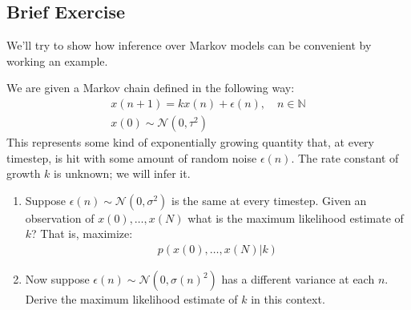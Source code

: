 \documentclass{article}
\begin{document}
\subsection{Brief Exercise}
We'll try to show how inference over Markov models can be convenient by working an example.
\begin{exercise}
We are given a Markov chain defined in the following way:
\begin{align*}
x(n + 1) = k x(n) + \epsilon(n), \quad n \in \mathbb{N} \\
x(0) \sim \mathcal{N}(0, \tau^2)
\end{align*}
This represents some kind of exponentially growing quantity that, at every timestep, is hit with some amount of random noise $\epsilon(n)$. The rate constant of growth $k$ is unknown; we will infer it.

\begin{enumerate}
	\item Suppose $\epsilon(n) \sim \mathcal{N}(0, \sigma^2)$ is the same at every timestep. Given an observation of $x(0), \dots, x(N)$ what is the maximum likelihood estimate of $k$? That is, maximize:
	\begin{align*}
	p(x(0), \dots, x(N) | k)
	\end{align*}
	
	\item Now suppose $\epsilon(n) \sim \mathcal{N}(0, \sigma(n)^2)$ has a different variance at each $n$. Derive the maximum likelihood estimate of $k$ in this context.
\end{enumerate}

\end{exercise}
\end{document}
